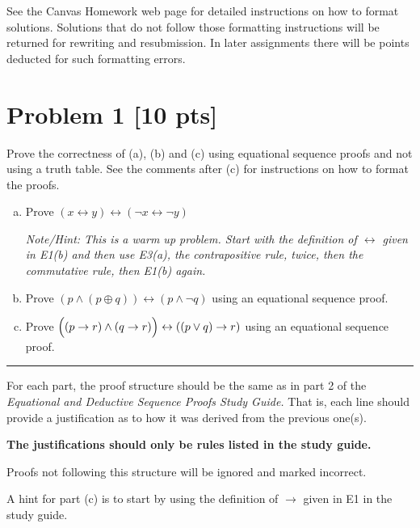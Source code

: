 \documentclass[12pt]{article}
\begin{document}
See the Canvas Homework web page for detailed instructions on how to format solutions.  Solutions that do not follow those formatting instructions  will be returned for rewriting and resubmission. In later assignments there will be points deducted for such formatting errors.  

\newpage

\section*{\textbf{Problem 1} [10 pts]}

Prove the correctness of (a), (b) and (c) using  equational sequence proofs and not using a truth table. See the comments after (c) for instructions on how to format the proofs.


\begin{enumerate}[(a)]
    
\item
Prove $(x\leftrightarrow y) \leftrightarrow (\neg x \leftrightarrow \neg y)$

{\em \small Note/Hint: This is a warm up problem. Start with the definition of  $\leftrightarrow$ given in E1(b) and then use E3(a), the contrapositive rule, twice, then the commutative rule, then E1(b) again.
}


\item Prove $(p \wedge (p \oplus q))\leftrightarrow (p \wedge \neg q)$ using an equational sequence proof.
\item Prove 
$\Bigl( ( p \rightarrow r) \wedge (q \rightarrow r)\Bigr) \leftrightarrow  \left( (p \vee q)\rightarrow r \right)$ using an equational sequence proof.


\end{enumerate}


\hrule

\bigskip

For each part,  the proof structure should be the same as in part 2 of the {\em Equational and Deductive Sequence Proofs Study Guide.} That is, each line should provide a justification as to how it was derived from the previous one(s).

{\bf The justifications should only be rules listed in the study guide.}



Proofs not following this structure will be ignored and marked incorrect.


A hint for part (c)  is to start by using the definition of $\rightarrow$ given in E1 in the study guide.
\end{document}
